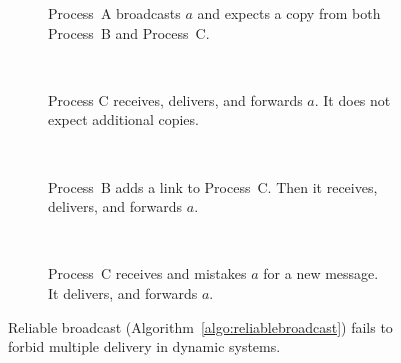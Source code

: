 

\begin{figure}
  \begin{center}
    \begin{subfigure}[t]{0.23\textwidth}
      \centering%
      \caption{\label{fig:memorylinkfailsA}Process~A broadcasts $a$ and expects a copy
        from both Process~B and Process~C.}
    \end{subfigure}
    ~
    \begin{subfigure}[t]{0.23\textwidth}
      \centering%
      \caption{\label{fig:memorylinkfailsB}Process C receives, delivers, and
        forwards $a$. It does not expect additional copies.}
    \end{subfigure}
    ~
    \begin{subfigure}[t]{0.23\textwidth}
      \centering%
      \caption{\label{fig:memorylinkfailsC}Process~B adds a link to Process~C. 
        Then it receives, delivers, and forwards $a$.}
    \end{subfigure}
    ~
    \begin{subfigure}[t]{0.23\textwidth}
      \centering%
      \caption{\label{fig:memorylinkfailsD}Process~C receives and mistakes $a$
        for a new message. It delivers, and forwards $a$.}
    \end{subfigure}
    \caption{\label{fig:memorylinkfails}Reliable broadcast
      (Algorithm~\ref{algo:reliablebroadcast}) fails to forbid multiple delivery
      in dynamic systems. }
  \end{center}
\end{figure}

